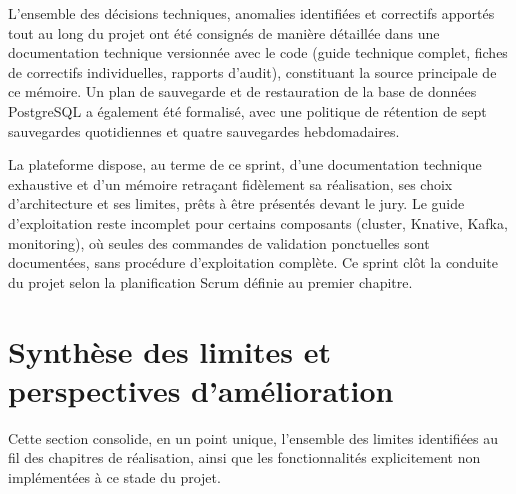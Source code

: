 L'ensemble des décisions techniques, anomalies identifiées et correctifs apportés tout au long du projet ont été consignés de manière détaillée dans une documentation technique versionnée avec le code (guide technique complet, fiches de correctifs individuelles, rapports d'audit), constituant la source principale de ce mémoire. Un plan de sauvegarde et de restauration de la base de données PostgreSQL a également été formalisé, avec une politique de rétention de sept sauvegardes quotidiennes et quatre sauvegardes hebdomadaires.

La plateforme dispose, au terme de ce sprint, d'une documentation technique exhaustive et d'un mémoire retraçant fidèlement sa réalisation, ses choix d'architecture et ses limites, prêts à être présentés devant le jury. Le guide d'exploitation reste incomplet pour certains composants (cluster, Knative, Kafka, monitoring), où seules des commandes de validation ponctuelles sont documentées, sans procédure d'exploitation complète. Ce sprint clôt la conduite du projet selon la planification Scrum définie au premier chapitre.

\section{Synthèse des limites et perspectives d'amélioration}

Cette section consolide, en un point unique, l'ensemble des limites identifiées au fil des chapitres de réalisation, ainsi que les fonctionnalités explicitement non implémentées à ce stade du projet.


